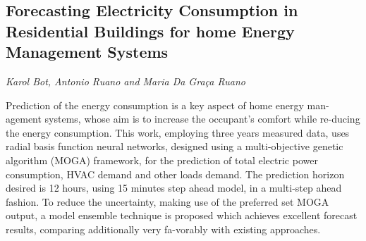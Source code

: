 \documentclass[../booklet.tex]{subfiles}
\begin{document}
\subsection[Forecasting Electricity Consumption in Residential Buildings for home Energy Management Systems. {\it Karol Bot, Antonio Ruano and Maria Da Graça Ruano}]{Forecasting Electricity Consumption in Residential Buildings for home Energy Management Systems}
  

\begin{center}
  {\it Karol Bot, Antonio Ruano and Maria Da Graça Ruano}
\end{center}

\vskip 0.8cm

Prediction of the energy consumption is a key aspect of home energy man-agement systems, whose aim is to increase the occupant's comfort while re-ducing the energy consumption. This work, employing three years measured data, uses radial basis function neural networks, designed using a multi-objective genetic algorithm (MOGA) framework, for the prediction of total electric power consumption, HVAC demand and other loads demand. The prediction horizon desired is 12 hours, using 15 minutes step ahead model, in a multi-step ahead fashion. To reduce the uncertainty, making use of the preferred set MOGA output, a model ensemble technique is proposed which achieves excellent forecast results, comparing additionally very fa-vorably with existing approaches.
\end{document}
